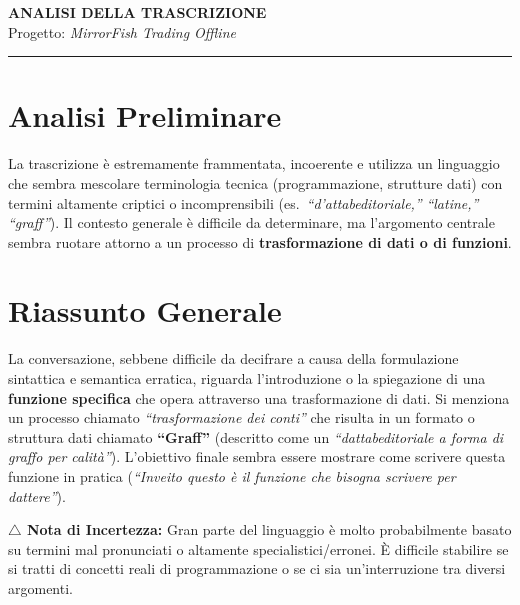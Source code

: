 \documentclass[12pt, a4paper]{article}
\begin{document}
\begin{center}
  {\LARGE\bfseries\color{primary} ANALISI DELLA TRASCRIZIONE}\\[0.4cm]
  {\large Progetto: \textit{MirrorFish Trading Offline}}\\[0.2cm]
  \textcolor{darkgray}{\rule{0.6\textwidth}{0.4pt}}
\end{center}

\vspace{0.8cm}

\section{Analisi Preliminare}

La trascrizione è estremamente frammentata, incoerente e utilizza un linguaggio che sembra mescolare terminologia tecnica (programmazione, strutture dati) con termini altamente criptici o incomprensibili (es.\ \textit{``d'attabeditoriale,''} \textit{``latine,''} \textit{``graff''}). Il contesto generale è difficile da determinare, ma l'argomento centrale sembra ruotare attorno a un processo di \textbf{trasformazione di dati o di funzioni}.

\vspace{0.5cm}

\section{Riassunto Generale}

La conversazione, sebbene difficile da decifrare a causa della formulazione sintattica e semantica erratica, riguarda l'introduzione o la spiegazione di una \textbf{funzione specifica} che opera attraverso una trasformazione di dati. Si menziona un processo chiamato \textit{``trasformazione dei conti''} che risulta in un formato o struttura dati chiamato \textbf{``Graff''} (descritto come un \textit{``dattabeditoriale a forma di graffo per calità''}). L'obiettivo finale sembra essere mostrare come scrivere questa funzione in pratica (\textit{``Inveito questo è il funzione che bisogna scrivere per dattere''}).

\vspace{0.3cm}

\noindent\textcolor{warningyellow}{\textbf{$\triangle$ Nota di Incertezza:}} Gran parte del linguaggio è molto probabilmente basato su termini mal pronunciati o altamente specialistici/erronei. È difficile stabilire se si tratti di concetti reali di programmazione o se ci sia un'interruzione tra diversi argomenti.
\end{document}
